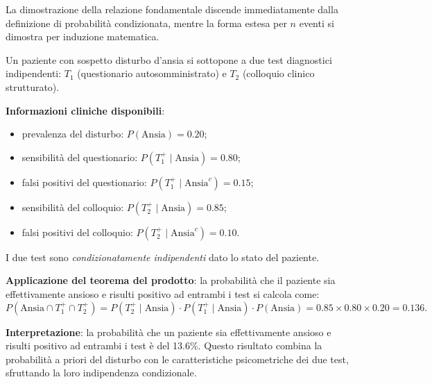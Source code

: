 \documentclass[
  letterpaper,
  DIV=11,
  numbers=noendperiod,
  oneside]{scrreprt}
\providecommand{\tightlist}{%
  \setlength{\itemsep}{0pt}\setlength{\parskip}{0pt}}
\theoremstyle{definition}
\theoremstyle{plain}
\theoremstyle{definition}
\theoremstyle{remark}
\begin{document}
La dimostrazione della relazione fondamentale discende immediatamente
dalla definizione di probabilità condizionata, mentre la forma estesa
per \(n\) eventi si dimostra per induzione matematica.

\begin{tcolorbox}[enhanced jigsaw, arc=.35mm, breakable, colbacktitle=quarto-callout-note-color!10!white, opacityback=0, toprule=.15mm, rightrule=.15mm, colback=white, opacitybacktitle=0.6, leftrule=.75mm, coltitle=black, bottomtitle=1mm, left=2mm, toptitle=1mm, title=\textcolor{quarto-callout-note-color}{\faInfo}\hspace{0.5em}{Esempio: Test diagnostici multipli}, titlerule=0mm, bottomrule=.15mm, colframe=quarto-callout-note-color-frame]

Un paziente con sospetto disturbo d'ansia si sottopone a due test
diagnostici indipendenti: \(T_1\) (questionario autosomministrato) e
\(T_2\) (colloquio clinico strutturato).

\textbf{Informazioni cliniche disponibili}:

\begin{itemize}
\tightlist
\item
  prevalenza del disturbo: \(P(\text{Ansia}) = 0.20\);
\item
  sensibilità del questionario: \(P(T_1^+ \mid \text{Ansia}) = 0.80\);
\item
  falsi positivi del questionario:
  \(P(T_1^+ \mid \text{Ansia}^c) = 0.15\);
\item
  sensibilità del colloquio: \(P(T_2^+ \mid \text{Ansia}) = 0.85\);
\item
  falsi positivi del colloquio: \(P(T_2^+ \mid \text{Ansia}^c) = 0.10\).
\end{itemize}

I due test sono \emph{condizionatamente indipendenti} dato lo stato del
paziente.

\textbf{Applicazione del teorema del prodotto}: la probabilità che il
paziente sia effettivamente ansioso e risulti positivo ad entrambi i
test si calcola come: \[
P(\text{Ansia} \cap T_1^+ \cap T_2^+) = P(T_2^+ \mid \text{Ansia}) \cdot P(T_1^+ \mid \text{Ansia}) \cdot P(\text{Ansia}) = 0.85 \times 0.80 \times 0.20 = 0.136.
\]

\textbf{Interpretazione}: la probabilità che un paziente sia
effettivamente ansioso e risulti positivo ad entrambi i test è del
13.6\%. Questo risultato combina la probabilità a priori del disturbo
con le caratteristiche psicometriche dei due test, sfruttando la loro
indipendenza condizionale.

\end{tcolorbox}
\end{document}
